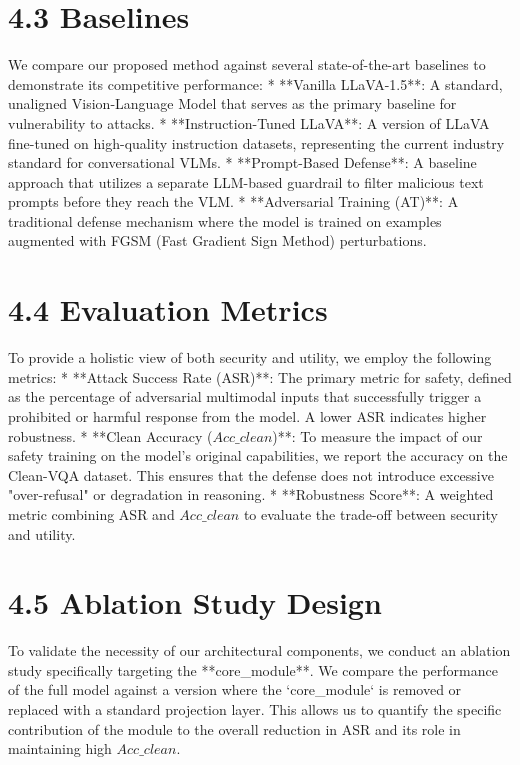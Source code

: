 \documentclass[11pt,a4paper]{article}
\begin{document}
\section{4.3 Baselines}
We compare our proposed method against several state-of-the-art baselines to demonstrate its competitive performance:
*   **Vanilla LLaVA-1.5**: A standard, unaligned Vision-Language Model that serves as the primary baseline for vulnerability to attacks.
*   **Instruction-Tuned LLaVA**: A version of LLaVA fine-tuned on high-quality instruction datasets, representing the current industry standard for conversational VLMs.
*   **Prompt-Based Defense**: A baseline approach that utilizes a separate LLM-based guardrail to filter malicious text prompts before they reach the VLM.
*   **Adversarial Training (AT)**: A traditional defense mechanism where the model is trained on examples augmented with FGSM (Fast Gradient Sign Method) perturbations.

\section{4.4 Evaluation Metrics}
To provide a holistic view of both security and utility, we employ the following metrics:
*   **Attack Success Rate (ASR)**: The primary metric for safety, defined as the percentage of adversarial multimodal inputs that successfully trigger a prohibited or harmful response from the model. A lower ASR indicates higher robustness.
*   **Clean Accuracy ($Acc\_{clean}$)**: To measure the impact of our safety training on the model's original capabilities, we report the accuracy on the Clean-VQA dataset. This ensures that the defense does not introduce excessive "over-refusal" or degradation in reasoning.
*   **Robustness Score**: A weighted metric combining ASR and $Acc\_{clean}$ to evaluate the trade-off between security and utility.

\section{4.5 Ablation Study Design}
To validate the necessity of our architectural components, we conduct an ablation study specifically targeting the **core\_module**. We compare the performance of the full model against a version where the `core\_module` is removed or replaced with a standard projection layer. This allows us to quantify the specific contribution of the module to the overall reduction in ASR and its role in maintaining high $Acc\_{clean}$.
\end{document}
